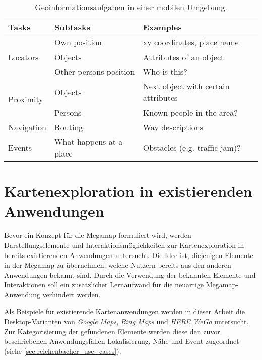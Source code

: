 \begin{table}[tbh]
    \centering
    \caption{Geoinformationsaufgaben in einer mobilen Umgebung. }
    \label{tab:gis_user_tasks}
    \begin{tabular}{@{}lll@{}}\toprule
        \textsf{\textbf{Tasks}} & \textsf{\textbf{Subtasks}} & \textsf{\textbf{Examples}}\\ \midrule
        \multirow{3}{*}{Locators} & Own position & xy coordinates, place name \\
                                  & Objects & Attributes of an object\\
                                  & Other persons position & Who is this?\\ \midrule
        \multirow{2}{*}{Proximity} & Objects & Next object with certain attributes\\
                                   & Persons & Known people in the area?\\ \midrule
        Navigation & Routing & Way descriptions\\ \midrule
        Events & What happens at a place & Obstacles (e.g. traffic jam)?\\ \bottomrule
    \end{tabular}
    \vspace{0.5em}
\end{table}

\section{Kartenexploration in existierenden Anwendungen}
Bevor ein Konzept für die Megamap formuliert wird, werden Darstellungselemente und Interaktionsmöglichkeiten zur Kartenexploration in bereits existierenden Anwendungen untersucht.
Die Idee ist, diejenigen Elemente in der Megamap zu übernehmen, welche Nutzern bereits aus den anderen Anwendungen bekannt sind.
Durch die Verwendung der bekannten Elemente und Interaktionen soll ein zusätzlicher Lernaufwand für die neuartige Megamap-Anwendung verhindert werden.

Als Beispiele für existierende Kartenanwendungen werden in dieser Arbeit die Desktop-Varianten von \emph{Google Maps}, \emph{Bing Maps} \parencite{Microsoft2018b} und \emph{HERE WeGo} \parencite{HERE2018} untersucht.
Zur Kategorisierung der gefundenen Elemente werden diese den zuvor beschriebenen Anwendungsfällen Lokalisierung, Nähe und Event zugeordnet (siehe \autoref{sec:reichenbacher_use_cases}).

